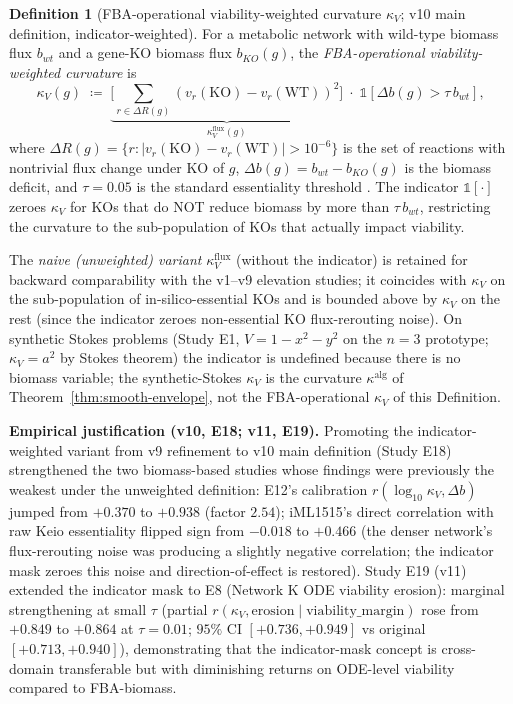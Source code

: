 \documentclass[11pt,a4paper]{article}
\theoremstyle{plain}
\theoremstyle{definition}
\newtheorem{definition}[theorem]{Definition}
\theoremstyle{remark}
\begin{document}
\begin{definition}[FBA-operational viability-weighted curvature $\kappa_V$;
v10 main definition, indicator-weighted]
\label{def:ard-derived-kappa-V}
For a metabolic network with wild-type biomass flux $b_{wt}$ and a
gene-KO biomass flux $b_{KO}(g)$, the
\emph{FBA-operational viability-weighted curvature} is
\begin{equation}\label{eq:kappa-V-FBA}
  \kappa_V(g) \;\coloneqq\;
  \underbrace{\Big[\textstyle\sum_{r\in\Delta R(g)}
  (v_r(\mathrm{KO}) - v_r(\mathrm{WT}))^2\Big]}_{\kappa_V^{\mathrm{flux}}(g)}
  \;\cdot\;
  \mathbb{1}\!\left[\Delta b(g) > \tau\,b_{wt}\right],
\end{equation}
where $\Delta R(g) = \{r : |v_r(\mathrm{KO}) - v_r(\mathrm{WT})| > 10^{-6}\}$
is the set of reactions with nontrivial flux change under KO of $g$,
$\Delta b(g) = b_{wt} - b_{KO}(g)$ is the biomass deficit, and
$\tau = 0.05$ is the standard essentiality threshold
\cite{orth2011}. The indicator $\mathbb{1}[\cdot]$ zeroes
$\kappa_V$ for KOs that do NOT reduce biomass by more than $\tau\,b_{wt}$,
restricting the curvature to the sub-population of KOs that actually impact
viability.

The \emph{naive (unweighted) variant} $\kappa_V^{\mathrm{flux}}$ (without
the indicator) is retained for backward comparability with the v1--v9
elevation studies; it coincides with $\kappa_V$ on the sub-population of
in-silico-essential KOs and is bounded above by $\kappa_V$ on the rest
(since the indicator zeroes non-essential KO flux-rerouting noise). On
synthetic Stokes problems (Study E1, $V = 1 - x^2 - y^2$ on the $n=3$
prototype; $\kappa_V = a^2$ by Stokes theorem) the indicator is undefined
because there is no biomass variable; the synthetic-Stokes $\kappa_V$ is
the curvature $\kappa^{\mathrm{alg}}$ of Theorem~\ref{thm:smooth-envelope}, not
the FBA-operational $\kappa_V$ of this Definition.

\textbf{Empirical justification (v10, E18; v11, E19).} Promoting the
indicator-weighted variant from v9 refinement to v10 main definition
(Study E18) strengthened the two biomass-based studies whose findings were
previously the weakest under the unweighted definition: E12's calibration
$r(\log_{10}\kappa_V, \Delta b)$ jumped from $+0.370$ to $+0.938$ (factor
$2.54$); iML1515's direct correlation with raw Keio essentiality flipped
sign from $-0.018$ to $+0.466$ (the denser network's flux-rerouting noise
was producing a slightly negative correlation; the indicator mask zeroes
this noise and direction-of-effect is restored). Study E19 (v11) extended
the indicator mask to E8 (Network K ODE viability erosion): marginal
strengthening at small $\tau$ (partial $r(\kappa_V, \mathrm{erosion} \mid
\mathrm{viability\_margin})$ rose from $+0.849$ to $+0.864$ at $\tau = 0.01$;
$95\%$ CI $[+0.736, +0.949]$ vs original $[+0.713, +0.940]$), demonstrating
that the indicator-mask concept is cross-domain transferable but with
diminishing returns on ODE-level viability compared to FBA-biomass.
\end{definition}
\end{document}
